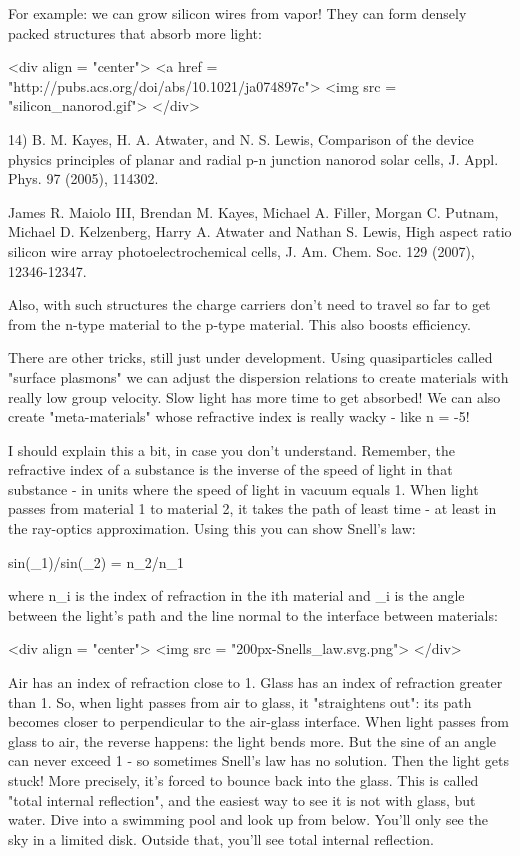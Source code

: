 For example: we can grow silicon wires from vapor!  They can form
densely packed structures that absorb more light:

<div align = "center">
<a href = "http://pubs.acs.org/doi/abs/10.1021/ja074897c">
<img src = "silicon_nanorod.gif">
</div>

14) B. M. Kayes, H. A. Atwater, and N. S. Lewis, Comparison of the
device physics principles of planar and radial p-n junction nanorod
solar cells, J. Appl. Phys. 97 (2005), 114302.

James R. Maiolo III, Brendan M. Kayes, Michael A. Filler, 
Morgan C. Putnam, Michael D. Kelzenberg, Harry A. Atwater 
and Nathan S. Lewis, High aspect ratio silicon wire array 
photoelectrochemical cells, J. Am. Chem. Soc. 129 (2007),
12346-12347.  

Also, with such structures the charge carriers don't need to travel
so far to get from the n-type material to the p-type material.  This
also boosts efficiency.

There are other tricks, still just under development.  Using quasiparticles
called "surface plasmons" we can adjust the dispersion relations to 
create materials with really low group velocity.  Slow light has more
time to get absorbed!  We can also create "meta-materials" whose 
refractive index is really wacky - like n = -5!   

I should explain this a bit, in case you don't understand.  Remember,
the refractive index of a substance is the inverse of the speed of
light in that substance - in units where the speed of light in vacuum
equals 1.  When light passes from material 1 to material 2, it takes 
the path of least time - at least in the ray-optics approximation.
Using this you can show Snell's law:

sin(\theta _{1})/sin(\theta _{2}) = n_{2}/n_{1}

where n_{i} is the index of refraction in the ith material and
\theta _{i} is the angle between the light's path and the line
normal to the interface between materials:

<div align = "center">
<img src = "200px-Snells_law.svg.png">
</div>

Air has an index of refraction close to 1.  Glass has an index of
refraction greater than 1.  So, when light passes from air to glass,
it "straightens out": its path becomes closer to
perpendicular to the air-glass interface.  When light passes from
glass to air, the reverse happens: the light bends more.  But the sine
of an angle can never exceed 1 - so sometimes Snell's law has no
solution.  Then the light gets stuck!  More precisely, it's forced to
bounce back into the glass.  This is called "total internal
reflection", and the easiest way to see it is not with glass, but
water.  Dive into a swimming pool and look up from below.  You'll only
see the sky in a limited disk.  Outside that, you'll see total
internal reflection.

